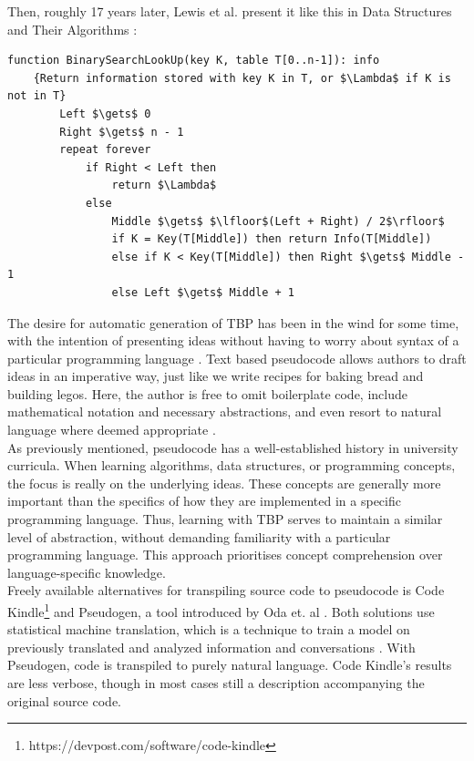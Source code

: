 Then, roughly 17 years later, Lewis et al. present it like this in Data Structures and Their Algorithms \cite[182]{BOOK:DSA/Lewis}:

\begin{lstlisting}[basicstyle=\small\ttfamily]
    function BinarySearchLookUp(key K, table T[0..n-1]): info
    {Return information stored with key K in T, or $\Lambda$ if K is not in T}
        Left $\gets$ 0
        Right $\gets$ n - 1
        repeat forever
            if Right < Left then
                return $\Lambda$
            else
                Middle $\gets$ $\lfloor$(Left + Right) / 2$\rfloor$
                if K = Key(T[Middle]) then return Info(T[Middle])
                else if K < Key(T[Middle]) then Right $\gets$ Middle - 1
                else Left $\gets$ Middle + 1
\end{lstlisting}

The desire for automatic generation of TBP has been in the wind for some time, with the intention of presenting ideas without having to worry about syntax of a particular programming language \cite{desireToGetPseudocodeGeneration}. Text based pseudocode allows authors to draft ideas in an imperative way, just like we write recipes for baking bread and building legos. Here, the author is free to omit boilerplate code, include mathematical notation and necessary abstractions, and even resort to natural language where deemed appropriate \cite{BOOK:intro/Cormen/Leiserson}\cite{DBLP:conf/els/Nuallain15}. \hfill \\

As previously mentioned, pseudocode has a well-established history in university curricula. When learning algorithms, data structures, or programming concepts, the focus is really on the underlying ideas. These concepts are generally more important than the specifics of how they are implemented in a specific programming language. Thus, learning with TBP serves to maintain a similar level of abstraction, without demanding familiarity with a particular programming language. This approach prioritises concept comprehension over language-specific knowledge. \hfill \\

Freely available alternatives for transpiling source code to pseudocode is Code Kindle\footnote{https://devpost.com/software/code-kindle} and Pseudogen, a tool introduced by Oda et. al \cite{DBLP:conf/kbse/OdaFNHSTN15}. Both solutions use statistical machine translation, which is a technique to train a model on previously translated and analyzed information and conversations%
. With Pseudogen, code is transpiled to purely natural language. Code Kindle's results are less verbose, though in most cases still a description accompanying the original source code. \hfill \\

